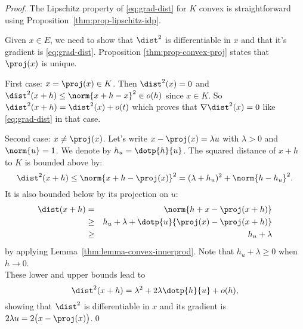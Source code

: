\begin{proof}
  The Lipschitz property of \eqref{eq:grad-dist} for $K$ convex is straightforward using Proposition~\ref{thm:prop-lipschitz-idp}.

  Given $x\in E$, we need to show that $\dist^2$ is differentiable in $x$ and that it's gradient is \eqref{eq:grad-dist}.
  Proposition \ref{thm:prop-convex-proj} states that $\proj(x)$ is unique.

  First case: $x=\proj(x)\in K$.
  Then $\dist^2(x)=0$ and $\dist^2(x+h) \leq \norm{x+h - x}^2 \in o(h)$ since $x\in K$.
  So $\dist^2(x+h) = \dist^2(x) + o(t)$ which proves that $\nabla\dist^2(x) = 0$ like \eqref{eq:grad-dist} in that case.

  Second case: $x\neq\proj(x)$.
  Let's write $x - \proj(x) = \lambda u$ with $\lambda > 0$ and $\norm{u}=1$.
  We denote by $h_u=\dotp{h}{u}$.
  The squared distance of $x+h$ to $K$ is bounded above by:
  \begin{equation*}
    \dist^2(x+h)
      \leq \norm{x+h - \proj(x)}^2
      = (\lambda + h_u)^2 + \norm{h - h_u}^2.
  \end{equation*}
  It is also bounded below by its projection on $u$:
  \begin{eqnarray*}
    \dist(x+h)
      & =   & \norm{h+x - \proj(x+h)} \\
      &\geq & h_u + \lambda + \dotp{u}{\proj(x)-\proj(x+h)} \\
      &\geq & h_u + \lambda
  \end{eqnarray*}
  by applying Lemma~\ref{thm:lemma-convex-innerprod}. Note that $h_u+\lambda \geq 0$ when $h\to 0$. \\
  These lower and upper bounds lead to
  \begin{equation*}
    \dist^2(x+h) = \lambda^2 + 2\lambda\dotp{h}{u} + o(h),
  \end{equation*}
  showing that $\dist^2$ is differentiable in $x$ and its gradient is $2\lambda u = 2\big(x-\proj(x)\big)$.\qed
\end{proof}